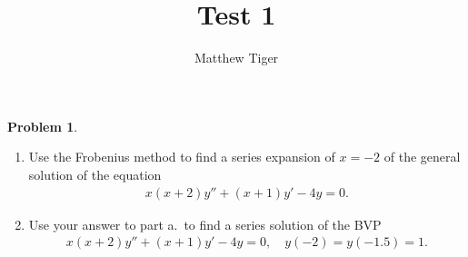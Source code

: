 \documentclass[12pt]{article}
\title{Test 1}
\author{Matthew Tiger}
\theoremstyle{definition}
\newtheorem{problem}{Problem}
\begin{document}
\maketitle


\begin{problem}
  \begin{enumerate}
    \item Use the Frobenius method to find a series expansion of $x=-2$
      of the general solution of the equation
      \begin{align}\label{diff_eq}
        x(x+2)y'' + (x+1)y' - 4y = 0.
      \end{align}
    \item Use your answer to part a.\ to find a series solution of the BVP
      \begin{align*}
        x(x+2)y'' + (x+1)y' - 4y = 0,\quad y(-2) = y(-1.5) = 1.
      \end{align*}
  \end{enumerate}
\end{problem}
\end{document}
